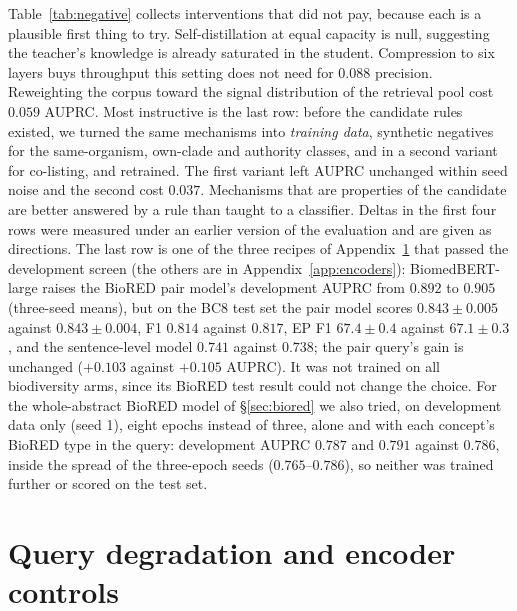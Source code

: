 \documentclass[11pt]{article}
\begin{document}
Table~\ref{tab:negative} collects interventions that did not pay, because each is a plausible first
thing to try. Self-distillation at equal capacity is null, suggesting the teacher's knowledge is
already saturated in the student. Compression to six layers buys throughput this setting does not
need for $0.088$ precision. Reweighting the corpus toward the signal distribution of the retrieval pool cost
$0.059$ AUPRC. Most instructive is the last row: before the candidate rules existed, we turned the
same mechanisms into \emph{training data}, synthetic negatives for the same-organism, own-clade and
authority classes, and in a second variant for co-listing, and retrained. The first variant left
AUPRC unchanged within seed noise and the second cost $0.037$. Mechanisms that are properties of the
candidate are better answered by a rule than taught to a classifier. Deltas in the first four rows
were measured under an earlier version of the evaluation and are given as directions. The last row
is one of the three recipes of Appendix~\ref{app:ablation} that passed the development screen (the
others are in Appendix~\ref{app:encoders}): BiomedBERT-large
raises the BioRED pair model's development AUPRC from $0.892$ to $0.905$ (three-seed means), but on
the BC8 test set the pair model scores $0.843 \pm 0.005$ against $0.843 \pm 0.004$, F1 $0.814$
against $0.817$, EP F1 $67.4 \pm 0.4$ against $67.1 \pm 0.3$, and the sentence-level model $0.741$
against $0.738$; the pair query's gain is unchanged ($+0.103$ against $+0.105$ AUPRC). It was not
trained on all biodiversity arms, since its BioRED test result could not change the choice.
For the whole-abstract BioRED model of \S\ref{sec:biored} we also tried, on development data only
(seed 1), eight epochs instead of three, alone and with each concept's BioRED type in the query:
development AUPRC $0.787$ and $0.791$ against $0.786$, inside the spread of the three-epoch seeds
($0.765$--$0.786$), so neither was trained further or scored on the test set.

\section{Query degradation and encoder controls}
\label{app:ablation}
\end{document}
